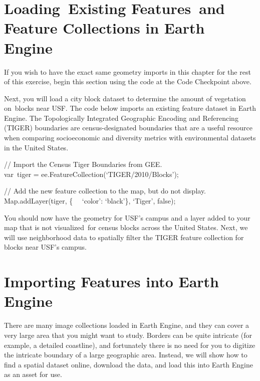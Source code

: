 \documentclass[
  letterpaper,
  DIV=11,
  numbers=noendperiod]{scrreprt}
\begin{document}
\hypertarget{loading-existing-features-and-feature-collections-in-earth-engine}{%
\section{Loading~Existing Features~and Feature Collections in Earth
Engine}\label{loading-existing-features-and-feature-collections-in-earth-engine}}

If you wish to have the exact same geometry imports in this chapter for
the rest of this exercise, begin this section using the code at the Code
Checkpoint above.

Next, you will load a city block dataset to determine the amount of
vegetation on~blocks near USF. The code below imports an existing
feature dataset in Earth Engine. The Topologically Integrated Geographic
Encoding and Referencing (TIGER) boundaries are census-designated
boundaries that are a useful resource when comparing socioeconomic and
diversity metrics with environmental datasets in the United States.

// Import the Census Tiger Boundaries from GEE.\\
var~tiger = ee.FeatureCollection(`TIGER/2010/Blocks');

// Add the new feature collection to the map, but do not display.\\
Map.addLayer(tiger, \{~ ~`color': `black'\}, `Tiger', false);

You should now have the geometry for USF's campus and a layer added to
your map that is not visualized~for census blocks across the United
States. Next, we will use neighborhood data to spatially filter the
TIGER feature collection for blocks near USF's campus.

\hypertarget{importing-features-into-earth-engine}{%
\section{Importing Features into Earth
Engine}\label{importing-features-into-earth-engine}}

There are many image collections loaded in Earth Engine, and they can
cover a very large area that you might want to study. Borders can be
quite intricate (for example, a detailed coastline), and fortunately
there is no need for you to digitize the intricate boundary of a large
geographic area. Instead, we will show how to find a spatial dataset
online, download the data, and load this into Earth Engine as an asset
for use.
\end{document}
